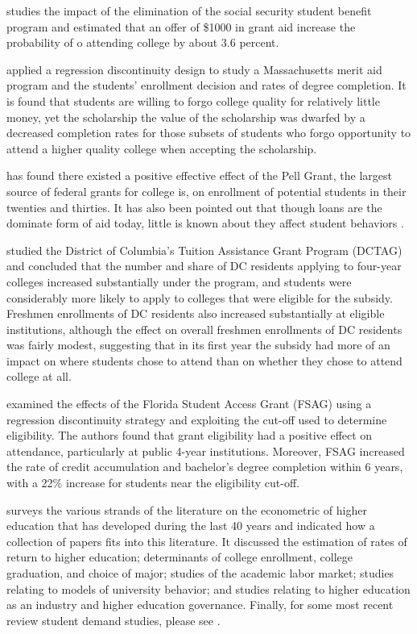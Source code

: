 \documentclass[12pt,english]{report}
\begin{document}
\citet{Dynarski2003} studies the impact of the elimination of the social security student benefit program and estimated that an offer of \$1000 in grant aid increase the probability of o attending college by about 3.6 percent.

\citet{Cohodes2014} applied a regression discontinuity design to study a Massachusetts merit aid program and the students' enrollment decision and rates of degree completion.  It is found that students are willing to forgo college quality for relatively little money, yet the scholarship the value of the scholarship was dwarfed by a decreased completion rates for those subsets of students who  forgo opportunity to attend a higher quality college when accepting the scholarship.

\citet{Turner2002} has found there existed a positive effective effect of the Pell Grant, the largest source of federal grants for college is, on enrollment of potential students in their twenties and thirties.  It has also been pointed out that though loans are the dominate form of aid today, little is known about they affect student behaviors \citep{Dynarski2013}. 

\citet{Abraham2006} studied the District of Columbia's Tuition Assistance Grant Program (DCTAG) and concluded that the number and share of DC residents applying to four-year colleges increased substantially under the program, and students were considerably more likely to apply to colleges that were eligible for the subsidy. Freshmen enrollments of DC residents also increased substantially at eligible institutions, although the effect on overall freshmen enrollments of DC residents was fairly modest, suggesting that in its first year the subsidy had more of an impact on where students chose to attend than on whether they chose to attend college at all.

\citet{Castleman2016} examined the effects of the Florida Student Access Grant (FSAG) using a regression discontinuity strategy and exploiting the cut-off used to determine eligibility. The authors found that grant eligibility had a positive effect on attendance, particularly at public 4-year institutions. Moreover, FSAG increased the rate of credit accumulation and bachelor’s degree completion within 6 years, with a 22\% increase for students near the eligibility cut-off.

\citet{Ehrenberg2004} surveys the various strands of the literature on the econometric of higher education that has developed during the last 40 years  and indicated how a collection of papers fits into this literature. It discussed the estimation of rates of return to higher education; determinants of college enrollment, college graduation, and choice of major; studies of the  academic labor market; studies relating to models of university behavior; and studies relating to higher education as an industry and higher education governance.  Finally, for some most recent review student demand studies, please see \citep{Dynarski2002, Dynarski2003, Dynarski2000, Dynarski2013}.
\end{document}

